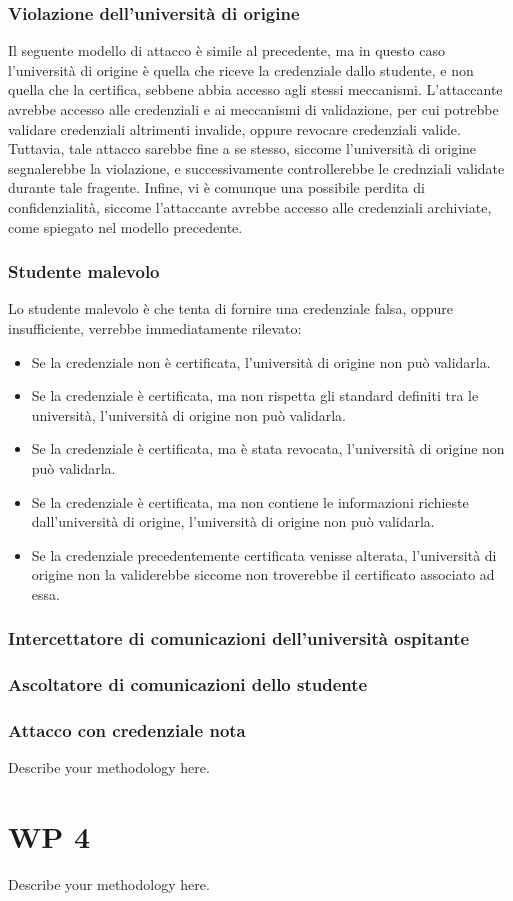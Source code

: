 \documentclass[a4paper,12pt]{article}
\begin{document}
\subsubsection{Violazione dell’università di origine}
Il seguente modello di attacco è simile al precedente, ma in questo caso l'università di origine è quella che riceve la credenziale dallo studente, e non quella che la certifica, sebbene abbia accesso agli stessi meccanismi. 
\newline L'attaccante avrebbe accesso alle credenziali e ai meccanismi di validazione, per cui potrebbe validare credenziali altrimenti invalide, oppure revocare credenziali valide.
Tuttavia, tale attacco sarebbe fine a se stesso, siccome l'università di origine segnalerebbe la violazione, e successivamente controllerebbe le crednziali validate durante tale fragente. 
Infine, vi è comunque una possibile perdita di confidenzialità, siccome l'attaccante avrebbe accesso alle credenziali archiviate,  come spiegato nel modello precedente.

\subsubsection{Studente malevolo}
Lo studente malevolo è che tenta di fornire una credenziale falsa, oppure insufficiente, verrebbe immediatamente rilevato: 
\begin{itemize}
    \item Se la credenziale non è certificata, l'università di origine non può validarla.
    \item Se la credenziale è certificata, ma non rispetta gli standard definiti tra le università, l'università di origine non può validarla.
    \item Se la credenziale è certificata, ma è stata revocata, l'università di origine non può validarla.
    \item Se la credenziale è certificata, ma non contiene le informazioni richieste dall'università di origine, l'università di origine non può validarla.
    \item Se la credenziale precedentemente certificata venisse alterata, l'università di origine non la validerebbe siccome non troverebbe il certificato associato ad essa.
\end{itemize}


\subsubsection{Intercettatore di comunicazioni dell'università ospitante}
\subsubsection{Ascoltatore di comunicazioni dello studente}
\subsubsection{Attacco con credenziale nota}


Describe your methodology here.
\newpage
\section{WP 4}
Describe your methodology here.
\end{document}
